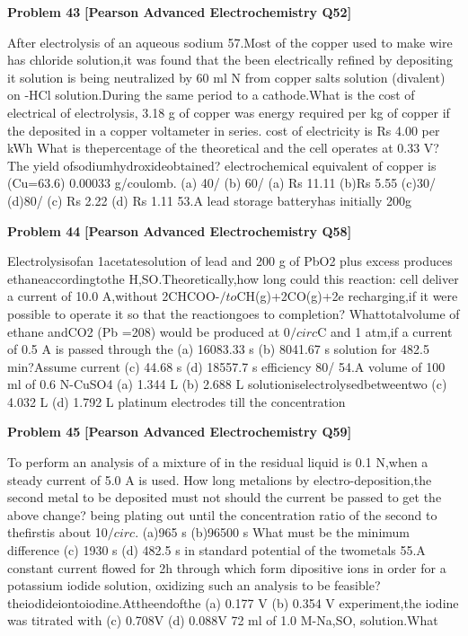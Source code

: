 \begin{problembox}
\textbf{Problem 43} \hfill \textbf{[Pearson Advanced Electrochemistry Q52]}
\label{q:ext-pearson-43}

After electrolysis of an aqueous sodium
57.Most of the copper used to make wire has
chloride solution,it was found that the
been electrically refined by depositing it
solution is being neutralized by 60 ml N
from copper salts solution (divalent) on
-HCl solution.During the same period
to a cathode.What is the cost of electrical
of electrolysis, 3.18 g of copper was
energy required per kg of copper if the
deposited in a copper voltameter in series.
cost of electricity is Rs 4.00 per kWh
What is thepercentage of the theoretical
and the cell operates at 0.33 V? The
yield ofsodiumhydroxideobtained?
electrochemical equivalent of copper is
(Cu=63.6)
0.00033 g/coulomb.
(a) 40/%
(b) 60/%
(a) Rs 11.11
(b)Rs 5.55
(c)30/%
(d)80/%
(c) Rs 2.22
(d) Rs 1.11
53.A lead storage batteryhas initially 200g
\end{problembox}

\begin{problembox}
\textbf{Problem 44} \hfill \textbf{[Pearson Advanced Electrochemistry Q58]}
\label{q:ext-pearson-44}

Electrolysisofan
1acetatesolution
of lead and 200 g of PbO2 plus excess
produces
ethaneaccordingtothe
H,SO.Theoretically,how long could this
reaction:
cell deliver a current of 10.0 A,without
2CHCOO-$/to$CH(g)+2CO(g)+2e
recharging,if it were possible to operate
it so that the reactiongoes to completion?
Whattotalvolume of ethane andCO2
(Pb =208)
would be produced at 0$/circ$C and 1 atm,if
a current of 0.5 A is passed through the
(a) 16083.33 s
(b) 8041.67 s
solution for 482.5 min?Assume current
(c) 44.68 s
(d) 18557.7 s
efficiency 80/%
54.A volume of 100 ml of 0.6 N-CuSO4
(a) 1.344 L
(b) 2.688 L
solutioniselectrolysedbetweentwo
(c) 4.032 L
(d) 1.792 L
platinum electrodes till the concentration
\end{problembox}

\begin{problembox}
\textbf{Problem 45} \hfill \textbf{[Pearson Advanced Electrochemistry Q59]}
\label{q:ext-pearson-45}

To perform an analysis of a mixture of
in the residual liquid is 0.1 N,when a
steady current of 5.0 A is used. How long
metalions by electro-deposition,the
second metal to be deposited must not
should the current be passed to get the
above change?
being plating out until the concentration
ratio of the second to thefirstis about 10$/circ$.
(a)965 s
(b)96500 s
What must be the minimum difference
(c) 1930 s
(d) 482.5 s
in standard potential of the twometals
55.A constant current flowed for 2h through
which form dipositive ions in order for
a potassium iodide solution, oxidizing
such an analysis to be feasible?
theiodideiontoiodine.Attheendofthe
(a) 0.177 V
(b) 0.354 V
experiment,the iodine was titrated with
(c) 0.708V
(d) 0.088V
72 ml of 1.0 M-Na,SO, solution.What
\end{problembox}

